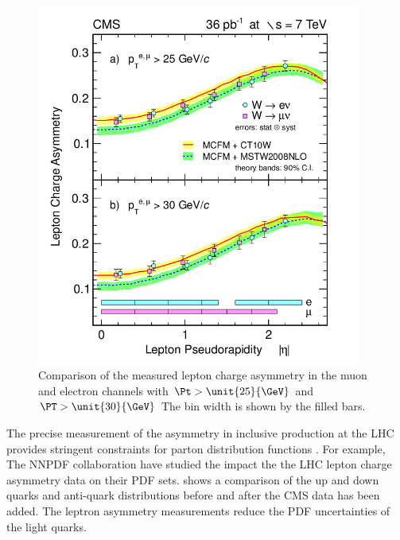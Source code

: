 \begin{figure}[htbp]
  \begin{center}
  \includegraphics*[width=0.95\textwidth]{combined}
  \caption{ Comparison of the measured lepton charge asymmetry in the muon and
electron channels with $\Pt>\unit{25}{\GeV}$ and $\PT>\unit{30}{\GeV}$
The bin width is shown by the filled bars\cite{asym36}.}
  \label{fig:combined}
  \end{center}
\end{figure}

The precise measurement of the asymmetry in inclusive \PW production at the LHC
provides stringent constraints for parton distribution functions \cite{asym840}.
For example, The NNPDF collaboration \cite{Lionetti:2011pw} have studied the
impact the the LHC \PW lepton charge asymmetry data on their PDF
sets\cite{Ball:2011gg}.  shows a comparison of the up and
down quarks and anti-quark distributions before and after the CMS data has been
added\cite{Ball:2011gg}.  The leptron asymmetry measurements reduce the PDF
uncertainties of the light quarks.

